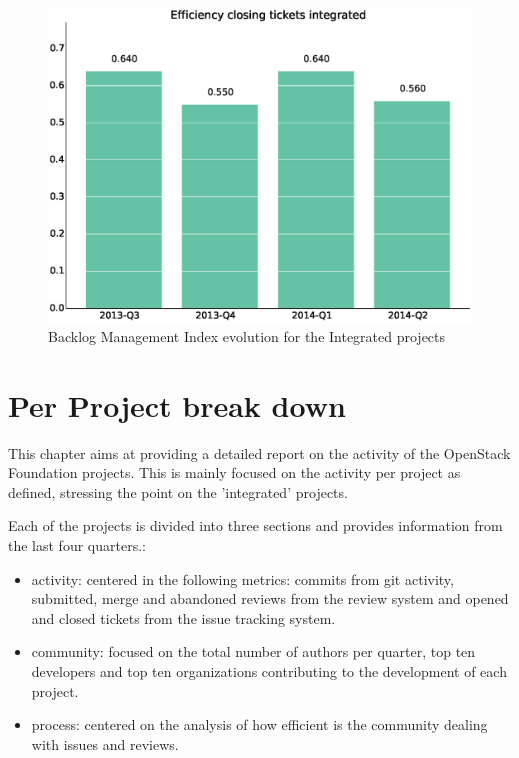 \documentclass[a4wide,11pt]{report}
\begin{document}
\begin{figure}[H]
\centering
\includegraphics[scale=.35]{figs/bmiintegrated.eps}
\caption{Backlog Management Index evolution for the Integrated projects}
\end{figure}







\chapter{Per Project break down}

This chapter aims at providing a detailed report on the activity of the OpenStack Foundation projects.
This is mainly focused on the activity per project as defined, stressing the point on the 'integrated' projects.

Each of the projects is divided into three sections and provides information from the last four quarters.: 
\begin{itemize}
\item activity: centered in the following metrics: commits from git activity, submitted, merge and abandoned reviews from the review system and
opened and closed tickets from the issue tracking system. 
\item community: focused on the total number of authors per quarter, top ten developers and top ten organizations contributing to the development
of each project.
\item process: centered on the analysis of how efficient is the community dealing with issues and reviews.
\end{itemize}
\end{document}
